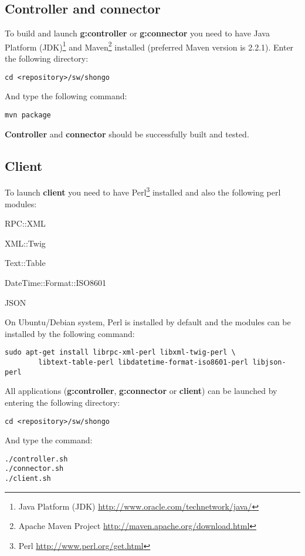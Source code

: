 \subsection{Controller and connector}
To build and launch \textbf{\gls{g:controller}} or \textbf{\gls{g:connector}} you need to have Java Platform (JDK)\footnote{Java Platform (JDK) \url{http://www.oracle.com/technetwork/java/}} and Maven\footnote{Apache Maven Project \url{http://maven.apache.org/download.html}} installed (preferred Maven version is 2.2.1). Enter the following directory:
\begin{verbatim}
cd <repository>/sw/shongo
\end{verbatim}
And type the following command:
\begin{verbatim}
mvn package
\end{verbatim}
\textbf{Controller} and \textbf{connector} should be successfully built and tested. 

\subsection{Client}
To launch \textbf{client} you need to have Perl\footnote{Perl \url{http://www.perl.org/get.html}} installed and also the following perl modules:
\begin{compactenum}
\item RPC::XML
\item XML::Twig
\item Text::Table
\item DateTime::Format::ISO8601
\item JSON
\end{compactenum}
On Ubuntu/Debian system, Perl is installed by default and the modules
can be installed by the following command:
\begin{verbatim}
sudo apt-get install librpc-xml-perl libxml-twig-perl \
        libtext-table-perl libdatetime-format-iso8601-perl libjson-perl
\end{verbatim}
All applications (\textbf{\gls{g:controller}}, \textbf{\gls{g:connector}} or \textbf{client}) can be launched by entering the following directory:
\begin{verbatim}
cd <repository>/sw/shongo
\end{verbatim}
And type the  command:
\begin{verbatim}
./controller.sh
./connector.sh
./client.sh
\end{verbatim}

